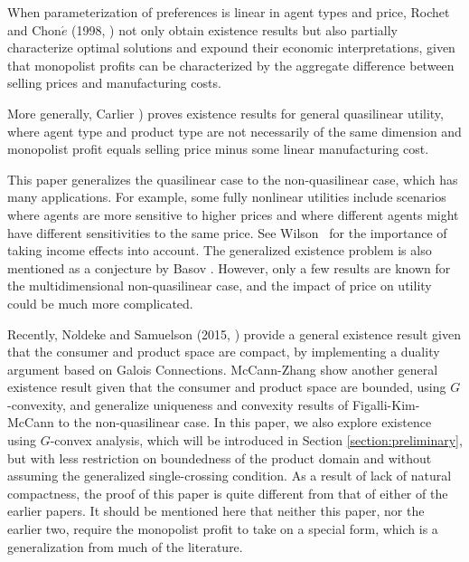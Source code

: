 \documentclass[a4paper, 11pt]{amsart}
\numberwithin{equation}{section}
\theoremstyle{plain}
\theoremstyle{definition}
\theoremstyle{remark}
\begin{document}
When parameterization of preferences is linear in agent types and price, Rochet and Chon$\acute{e}$ (1998, \cite{RochetChone98}) not only obtain existence results but also partially characterize optimal solutions and expound their economic interpretations, %
given that monopolist profits can be characterized by {the aggregate difference between selling prices and manufacturing costs.}\medskip

More generally, Carlier \cite{Carlier01}) proves existence results for general quasilinear utility, where agent type and product type are not necessarily of the same dimension and monopolist profit equals selling price minus some linear manufacturing cost.\medskip

This paper generalizes the quasilinear case to the non-quasilinear case, which has many applications. For example, some fully nonlinear utilities include scenarios where agents are more sensitive to higher prices and where different agents might have different sensitivities to the same price. %
See Wilson~\cite[Chapter 7]{Wilson93} for the importance of taking income effects into account. 
The generalized existence problem is also mentioned as a conjecture by Basov \cite[Chapter~8]{Basov05}. However, only a few results are known for the multidimensional non-quasilinear case, and the impact of price on utility could be much more complicated.\medskip


Recently, N$\ddot{o}$ldeke and Samuelson (2015, \cite{NoldekeSamuelson15p}) provide a general existence result given that the consumer and product space are compact, by implementing a duality argument based on Galois Connections. McCann-Zhang \cite{McCannZhang17} show another general existence result given that the consumer and product space are bounded, using $G$-convexity, and generalize uniqueness and convexity results of Figalli-Kim-McCann \cite{FigalliKimMcCann11} to the non-quasilinear case. In this paper, we also explore existence using $G$-convex analysis, which will be introduced in Section \ref{section:preliminary}, but with less restriction on boundedness of the product domain and without assuming the generalized single-crossing condition. As a result of lack of natural compactness, the proof of this paper is quite different from that of either of the %
 earlier papers. It should be mentioned here that {neither} this paper, %
{nor the earlier two}, %
require the monopolist profit to take on a special form, which is a generalization from much of the literature.\medskip
\end{document}
